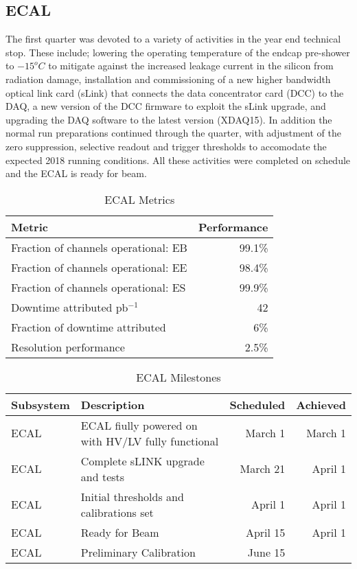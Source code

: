 \documentclass[12pt]{article}
\begin{document}
\subsection{ECAL }
The first quarter was devoted to a variety of activities in the year end technical stop. These include;  lowering the operating temperature of the endcap pre-shower to $-15^{o}C$ to mitigate against the increased leakage current in the silicon from radiation damage, installation and commissioning of a new higher bandwidth optical link card (sLink) that connects the data concentrator card (DCC) to the DAQ, a new version of the DCC firmware to exploit the sLink upgrade, and upgrading the DAQ software to the latest version (XDAQ15). In addition the normal run preparations continued through the quarter, with adjustment of the zero suppression, selective readout and trigger thresholds to accomodate the expected 2018 running conditions. All these activities were completed on schedule and the ECAL is ready for beam. 



\begin{table}[htp]
\caption{ECAL Metrics}
\begin{center}
\begin{tabular}{|l|r|}
\hline
Metric&Performance\\
\hline
Fraction of channels operational: EB& 99.1\% \\
\hline
Fraction of channels operational: EE& 98.4\%\\
\hline
Fraction of channels operational: ES& 99.9\%\\
\hline
Downtime attributed pb$^{-1}$ & 42 \\
Fraction of downtime attributed& 6\% \\
\hline
Resolution performance & 2.5\% \\
\hline
\end{tabular}
\end{center}
\label{ECALMetrics}
\end{table}%


\begin{table}[htp]
\caption{ECAL Milestones}
\begin{center}
\begin{tabular}{|l|l|r|r|}
\hline
Subsystem&Description&Scheduled&Achieved\\
\hline
ECAL & ECAL fiully powered on with HV/LV fully functional & March 1 & March 1 \\ \hline
ECAL & Complete sLINK upgrade and tests & March 21 &  April 1 \\ \hline
ECAL & Initial thresholds and calibrations set  & April 1 & April 1 \\ \hline
ECAL & Ready for Beam & April 15 &  April 1 \\
\hline
ECAL & Preliminary Calibration & June 15&  \\
\hline
\end{tabular}
\end{center}
\label{ECALMilestones}
\end{table}%
\end{document}

